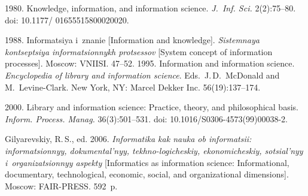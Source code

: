 \begin{multicols}{2}
{{\begin{thebibliography}{99}
 1980. Knowledge, information, and information science. \textit{J.~Inf. Sci.} 
 2(2):75--80. doi: 10.1177/ 01655515800020020.

 1988. Informatsiya i~znanie [Information and knowledge]. \textit{Sistemnaya 
kontseptsiya in\-for\-ma\-tsi\-on\-nykh protsessov} [System concept of information processes]. Moscow: VNIISI.  
47--52.
 1995. Information and information science. \textit{Encyclopedia of library and 
information science}. Eds.\ J.\,D.~McDonald and M.~Levine-Clark. New York, NY: Marcel Dekker Inc. 56(19):137--174.

 2000. Library and information science: Practice, theory, and philosophical basis. 
\textit{Inform. Process. Manag.} 36(3):501--531. doi: 10.1016/S0306-\mbox{4573(99)00038-2}.

Gilyarevskiy, R.\,S., ed. 2006. \textit{Informatika kak nauka ob informatsii: informatsionnyy, 
dokumental'nyy, tekhno-logicheskiy, ekonomicheskiy, sotsial'nyy i~organizatsionnyy aspekty} [Informatics as 
information science: Informational, documentary, technological, economic, social, and organizational 
dimensions]. Moscow: FAIR-PRESS. 592~p.


\end{thebibliography}}}
\end{multicols}
